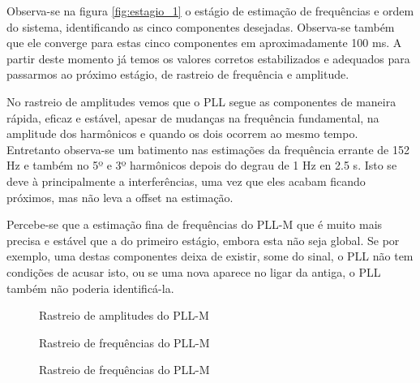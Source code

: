 Observa-se na figura \ref{fig:estagio_1} o estágio de estimação de frequências e ordem do sistema, identificando as cinco componentes desejadas. Observa-se também que ele converge para estas cinco componentes em aproximadamente 100 ms. A partir deste momento já temos os valores corretos estabilizados e adequados para passarmos ao próximo estágio, de rastreio de frequência e amplitude. 

\indent No rastreio de amplitudes vemos que o PLL segue as componentes de maneira rápida, eficaz e estável, apesar de mudanças na frequência fundamental, na amplitude dos harmônicos e quando os dois ocorrem ao mesmo tempo. Entretanto observa-se um batimento nas estimações da frequência errante de 152 Hz e também no 5º e 3º harmônicos depois do degrau de 1 Hz en 2.5 s. Isto se deve à principalmente a interferências, uma vez que eles acabam ficando próximos, mas não leva a offset na estimação.

\indent Percebe-se que a estimação fina de frequências do PLL-M que é muito mais precisa e estável que a do primeiro estágio, embora esta não seja global. Se por exemplo, uma destas componentes deixa de existir, some do sinal, o PLL não tem condições de acusar isto, ou se uma nova aparece no ligar da antiga, o PLL também não poderia identificá-la.

\begin{figure}[H]
	\centering    
	\def\svgwidth{\columnwidth}
	
	\caption{Rastreio de amplitudes do PLL-M}
	\label{fig:rastreio_final}
\end{figure}

\begin{figure}[H]
	\centering    
	\def\svgwidth{\columnwidth}
	
	\caption{Rastreio de frequências do PLL-M}
	\label{fig:amplitudes}
\end{figure}
\begin{figure}[H]
	\centering    
	\def\svgwidth{\columnwidth}
	
	\caption{Rastreio de frequências do PLL-M}
	\label{fig:amplitudes}
\end{figure}



